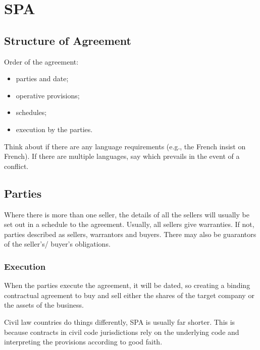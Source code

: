 \documentclass[
]{article}
\author{}
\date{}
\providecommand{\tightlist}{%
  \setlength{\itemsep}{0pt}\setlength{\parskip}{0pt}}
\begin{document}
{
\setcounter{tocdepth}{3}
\tableofcontents
}
\hypertarget{spa}{%
\section{SPA}\label{spa}}

\hypertarget{structure-of-agreement}{%
\subsection{Structure of Agreement}\label{structure-of-agreement}}

Order of the agreement:

\begin{itemize}
\tightlist
\item
  parties and date;
\item
  operative provisions;
\item
  schedules;
\item
  execution by the parties.
\end{itemize}

Think about if there are any language requirements (e.g., the French
insist on French). If there are multiple languages, say which prevails
in the event of a conflict.

\hypertarget{parties}{%
\subsection{Parties}\label{parties}}

Where there is more than one seller, the details of all the sellers will
usually be set out in a schedule to the agreement. Usually, all sellers
give warranties. If not, parties described as sellers, warrantors and
buyers. There may also be guarantors of the seller's/ buyer's
obligations.

\hypertarget{execution}{%
\subsubsection{Execution}\label{execution}}

When the parties execute the agreement, it will be dated, so creating a
binding contractual agreement to buy and sell either the shares of the
target company or the assets of the business.

Civil law countries do things differently, SPA is usually far shorter.
This is because contracts in civil code jurisdictions rely on the
underlying code and interpreting the provisions according to good faith.
\end{document}
